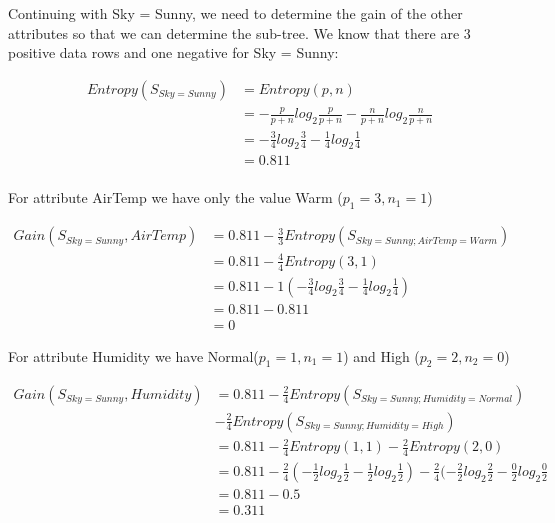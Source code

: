 \documentclass[10pt,a4paper]{article}
\begin{document}
{{{{{{{{{{Continuing with Sky = Sunny, we need to determine the gain of the other attributes so that we can determine the sub-tree. We know that there are 3 positive data rows and one negative for Sky = Sunny:

\begin{equation}
\begin{split}
Entropy(S_{Sky=Sunny}) &= Entropy(p,n) \\
                       &= -\frac{p}{p+n}log_2\frac{p}{p+n} - \frac{n}{p+n}log_2\frac{n}{p+n}  \\
                       &= -\frac{3}{4} log_2\frac{3}{4} -\frac{1}{4} log_2\frac{1}{4} \\
                       &= 0.811   \\
\end{split}
\end{equation}

For attribute AirTemp we have only the value Warm ($p_1=3,n_1=1$)

\begin{equation}
\begin{split}
Gain(S_{Sky=Sunny},AirTemp) &= 0.811 - \frac{3}{3} Entropy(S_{Sky=Sunny;AirTemp=Warm} )\\
          &= 0.811 - \frac{4}{4} Entropy(3,1) \\
          &= 0.811 - 1( -\frac{3}{4} log_2\frac{3}{4} -\frac{1}{4} log_2\frac{1}{4} )  \\
          &= 0.811 - 0.811  \\
          &= 0
\end{split}
\end{equation}

For attribute Humidity we have Normal($p_1=1,n_1=1$) and High ($p_2=2,n_2=0$)

\begin{equation}
\begin{split}
Gain(S_{Sky=Sunny},Humidity) &= 0.811 - \frac{2}{4} Entropy(S_{Sky=Sunny;Humidity=Normal} )\\
                                      &-\frac{2}{4}Entropy(S_{Sky=Sunny;Humidity=High})\\
          &= 0.811 - \frac{2}{4} Entropy(1,1) - \frac{2}{4}Entropy(2,0) \\
          &= 0.811 - \frac{2}{4}( -\frac{1}{2} log_2\frac{1}{2} -\frac{1}{2} log_2\frac{1}{2} ) 
                   - \frac{2}{4}( -\frac{2}{2} log_2\frac{2}{2} -\frac{0}{2} log_2\frac{0}{2} \\
          &= 0.811 - 0.5  \\
          &= 0.311
\end{split}
\end{equation}

}}}}}}}}}}
\end{document}
